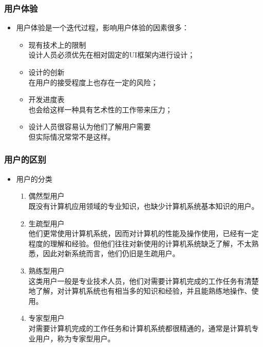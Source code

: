 \documentclass{beamer}
\begin{document}
\begin{frame}
	\frametitle{用户体验}
	\beamertemplatetransparentcovereddynamicmedium
	\begin{itemize}[<+->]
		\item 用户体验是一个迭代过程，影响用户体验的因素很多：
		\begin{itemize}
			\item 现有技术上的限制\\{\tiny 设计人员必须优先在相对固定的UI框架内进行设计；}
			\item 设计的创新\\{\tiny 在用户的接受程度上也存在一定的风险；}
			\item 开发进度表\\{\tiny 也会给这样一种具有艺术性的工作带来压力；}
			\item 设计人员很容易认为他们了解用户需要\\{\tiny 但实际情况常常不是这样。}
		\end{itemize}
	\end{itemize}
\end{frame}

\begin{frame}
	\frametitle{用户的区别}
	\beamertemplatetransparentcovereddynamicmedium
	\begin{itemize}[<+->]
		\item 用户的分类
		\begin{enumerate}
			\item 偶然型用户\\{\tiny 既没有计算机应用领域的专业知识，也缺少计算机系统基本知识的用户。}
			\item 生疏型用户\\{\tiny 他们更常使用计算机系统，因而对计算机的性能及操作使用，已经有一定程度的理解和经验。但他们往往对新使用的计算机系统缺乏了解，不太熟悉，因此对新系统而言，他们仍旧是生疏用户。}
			\item 熟练型用户\\{\tiny 这类用户一般是专业技术人员，他们对需要计算机完成的工作任务有清楚地了解，对计算机系统也有相当多的知识和经验，并且能熟练地操作、使用。}
			\item 专家型用户\\{\tiny 对需要计算机完成的工作任务和计算机系统都很精通的，通常是计算机专业用户，称为专家型用户。}
		\end{enumerate}
	\end{itemize}
\end{frame}
\end{document}
